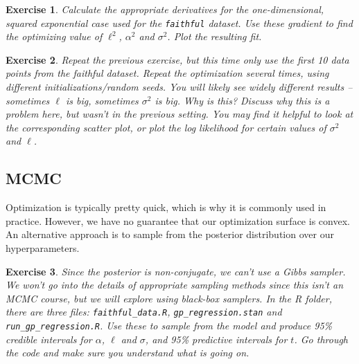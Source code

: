 \documentclass[twoside]{article}
\newcounter{lecnum}
\newtheorem{exercise}{Exercise}[lecnum]
\begin{document}
 \begin{exercise}
   Calculate the appropriate derivatives for the one-dimensional, squared exponential case used for the \texttt{faithful} dataset. Use these gradient to find the optimizing value of $\ell^2$, $\alpha^2$ and $\sigma^2$. Plot the resulting fit.
 \end{exercise}


 \begin{exercise}
   Repeat the previous exercise, but this time only use the first 10 data points from the faithful dataset. Repeat the optimization several times, using different initializations/random seeds. You will likely see widely different results -- sometimes $\ell$ is big, sometimes $\sigma^2$ is big. Why is this? Discuss why this is a problem here, but wasn't in the previous setting. You may find it helpful to look at the corresponding scatter plot, or plot the log likelihood for certain values of $\sigma^2$ and $\ell$.
 \end{exercise}
 
 \subsection{MCMC}
 Optimization is typically pretty quick, which is why it is commonly used in practice. However, we have no guarantee that our optimization surface is convex. An alternative approach is to sample from the posterior distribution over our hyperparameters.


 \begin{exercise}
   Since the posterior is non-conjugate, we can't use a Gibbs sampler. We won't go into the details of appropriate sampling methods since this isn't an MCMC course, but we will explore using black-box samplers. In the R folder, there are three files: \texttt{faithful\_data.R}, \texttt{gp\_regression.stan} and \texttt{run\_gp\_regression.R}. Use these to sample from the model and produce 95\% credible intervals for $\alpha$, $\ell$ and $\sigma$, and 95\% predictive intervals for $t$. Go through the code and make sure you understand what is going on.

 \end{exercise}
\end{document}
